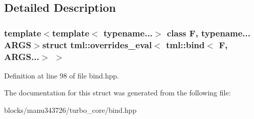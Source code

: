 \subsection{Detailed Description}
\subsubsection*{template$<$template$<$ typename...$>$ class F, typename... A\+R\+G\+S$>$struct tml\+::overrides\+\_\+eval$<$ tml\+::bind$<$ F, A\+R\+G\+S...$>$ $>$}



Definition at line 98 of file bind.\+hpp.



The documentation for this struct was generated from the following file\+:\begin{DoxyCompactItemize}
\item 
blocks/manu343726/turbo\+\_\+core/bind.\+hpp\end{DoxyCompactItemize}
